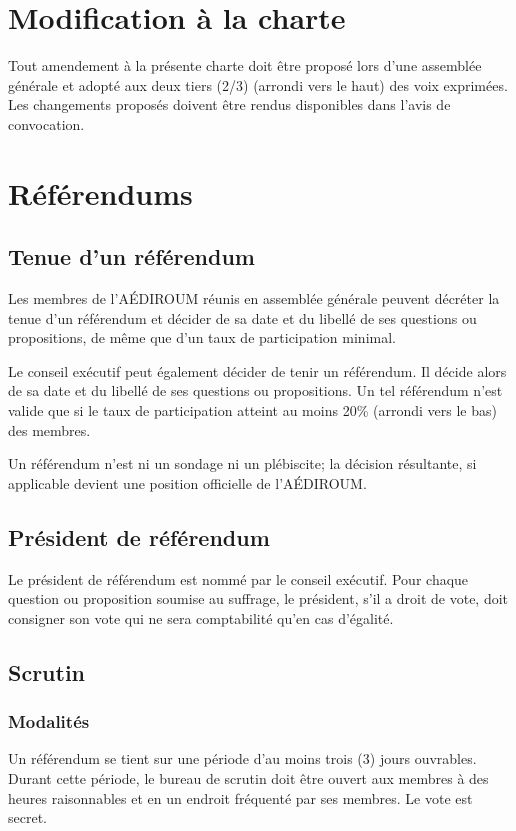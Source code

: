 \documentclass[12pt]{article}
\begin{document}
\section{Modification à la charte}

Tout amendement à la présente charte doit être proposé lors d'une assemblée générale et adopté aux deux tiers (2/3) (arrondi vers le haut) des voix exprimées. Les changements proposés doivent être rendus disponibles dans l'avis de convocation.

\section{Référendums}
\subsection{Tenue d'un référendum}
Les membres de l'AÉDIROUM réunis en assemblée générale peuvent décréter la tenue d'un référendum et décider de sa date et du libellé de ses questions ou propositions, de même que d'un taux de participation minimal.

Le conseil exécutif peut également décider de tenir un référendum. Il décide alors de sa date et du libellé de ses questions ou propositions. Un tel référendum n'est valide que si le taux de participation atteint au moins 20\% (arrondi vers le bas) des membres.

Un référendum n'est ni un sondage ni un plébiscite; la décision résultante, si applicable devient une position officielle de l'AÉDIROUM.

\subsection{Président de référendum}

Le président de référendum est nommé par le conseil exécutif. Pour chaque question ou proposition soumise au suffrage, le président, s'il a droit de vote, doit consigner son vote qui ne sera comptabilité qu'en cas d'égalité.

\subsection{Scrutin}
\subsubsection{Modalités}

Un référendum se tient sur une période d'au moins trois (3) jours ouvrables. Durant cette période, le bureau de scrutin doit être ouvert aux membres à des heures raisonnables et en un endroit fréquenté par ses membres. Le vote est secret.
\end{document}
